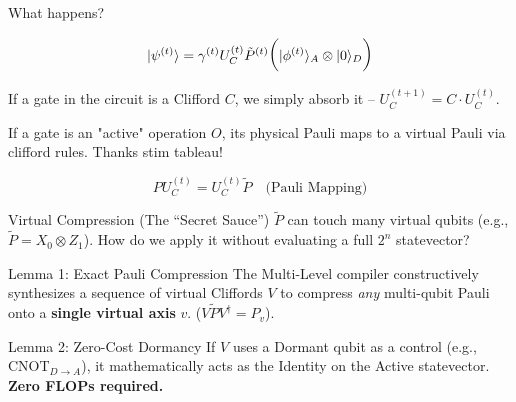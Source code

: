 \documentclass[11pt, aspectratio=169]{beamer}
\begin{document}
\begin{frame}{What happens?}

  \begin{equation*}
      \Large |\psi^{(t)}\rangle = \gamma^{(t)} U_C^{(t)} \tilde{P}^{(t)} \Big( |\phi^{(t)}\rangle_A \otimes |0\rangle_D \Big)
  \end{equation*}

  If a gate in the circuit is a Clifford $C$, we simply absorb it -- $U_C^{(t+1)} = C \cdot U_C^{(t)}$.

  If a gate is an "active" operation $O$, its physical Pauli maps to a virtual Pauli via clifford rules. Thanks stim tableau!

  \begin{equation*}
      P U_C^{(t)} = U_C^{(t)} \tilde{P} \quad \text{(Pauli Mapping)}
  \end{equation*}
\end{frame}

\begin{frame}{Virtual Compression (The ``Secret Sauce'')}
  $\tilde{P}$ can touch many virtual qubits (e.g., $\tilde{P} = X_0 \otimes Z_1$). How do we apply it without evaluating a full $2^n$ statevector?

  \vspace{0.5em}
  \begin{block}{Lemma 1: Exact Pauli Compression}
      The Multi-Level compiler constructively synthesizes a sequence of virtual Cliffords $V$ to compress \textit{any} multi-qubit Pauli onto a \textbf{single virtual axis} $v$. ($V \tilde{P} V^\dagger = P_v$).
  \end{block}

  \begin{block}{Lemma 2: Zero-Cost Dormancy}
      If $V$ uses a Dormant qubit as a control (e.g., CNOT$_{D \to A}$), it mathematically acts as the Identity on the Active statevector. \textbf{Zero FLOPs required.}
  \end{block}
\end{frame}
\end{document}
